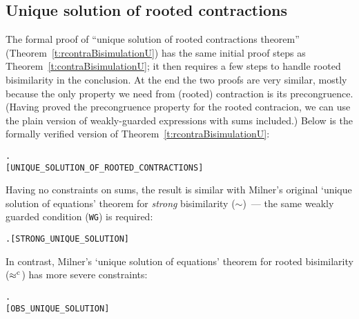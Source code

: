 \subsection{Unique solution of rooted contractions}

The formal proof of ``unique solution of rooted contractions theorem''
(Theorem~\ref{t:rcontraBisimulationU}) has the
same initial proof steps as Theorem~\ref{t:contraBisimulationU}; 
it then requires a
few steps to handle  rooted bisimilarity in the conclusion. 
At the end the
two proofs are very similar, mostly because the only property we need
from (rooted) contraction is its precongruence. 
(Having proved
the precongruence property for the rooted contracion, 
we can use the
plain version of weakly-guarded expressions with sums
included.) Below is the formally verified version of
Theorem~\ref{t:rcontraBisimulationU}:
\begin{alltt}
\HOLTokenTurnstile{}   \HOLSymConst{\HOLTokenImp{}} \HOLSymConst{\HOLTokenForall{}} .  \HOLSymConst{\HOLTokenObsContracts}   \HOLSymConst{\HOLTokenConj{}}  \HOLSymConst{\HOLTokenObsContracts}   \HOLSymConst{\HOLTokenImp{}}  \HOLSymConst{\HOLTokenObsCongr} 
\hfill{[UNIQUE_SOLUTION_OF_ROOTED_CONTRACTIONS]}
\end{alltt}

Having no constraints on sums, the result is
 similar with Milner's original `unique solution of
equations' theorem for \emph{strong} bisimilarity ($\sim$)~--- 
the same
weakly guarded  condition (\texttt{WG}) is required:
\begin{alltt}
\HOLTokenTurnstile{}   \HOLSymConst{\HOLTokenImp{}} \HOLSymConst{\HOLTokenForall{}} .  \HOLSymConst{\HOLTokenStrongEQ}   \HOLSymConst{\HOLTokenConj{}}  \HOLSymConst{\HOLTokenStrongEQ}   \HOLSymConst{\HOLTokenImp{}}  \HOLSymConst{\HOLTokenStrongEQ} \hfill{[STRONG_UNIQUE_SOLUTION]}
\end{alltt}




In contrast, Milner's `unique solution of
equations' theorem for rooted bisimilarity ($\mathrel{\approx^{\rm{c}}}$)
has more severe constraints: 
\begin{alltt}
\HOLTokenTurnstile{}   \HOLSymConst{\HOLTokenConj{}}   \HOLSymConst{\HOLTokenImp{}} \HOLSymConst{\HOLTokenForall{}} .  \HOLSymConst{\HOLTokenObsCongr}   \HOLSymConst{\HOLTokenConj{}}  \HOLSymConst{\HOLTokenObsCongr}   \HOLSymConst{\HOLTokenImp{}}  \HOLSymConst{\HOLTokenObsCongr} 
\hfill{[OBS_UNIQUE_SOLUTION]}
\end{alltt}
